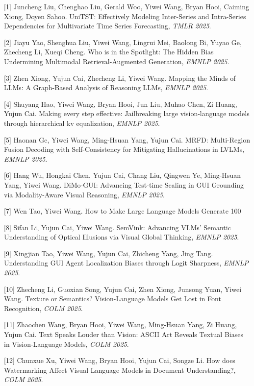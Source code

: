 [1] Juncheng Liu, Chenghao Liu, Gerald Woo, Yiwei Wang, Bryan Hooi, Caiming Xiong, Doyen Sahoo. UniTST: Effectively Modeling Inter-Series and Intra-Series Dependencies for Multivariate Time Series Forecasting, \textit{TMLR 2025}.

[2] Jiayu Yao, Shenghua Liu, Yiwei Wang, Lingrui Mei, Baolong Bi, Yuyao Ge, Zhecheng Li, Xueqi Cheng. Who is in the Spotlight: The Hidden Bias Undermining Multimodal Retrieval-Augmented Generation, \textit{EMNLP 2025}.

[3] Zhen Xiong, Yujun Cai, Zhecheng Li, Yiwei Wang. Mapping the Minds of LLMs: A Graph-Based Analysis of Reasoning LLMs, \textit{EMNLP 2025}.

[4] Shuyang Hao, Yiwei Wang, Bryan Hooi, Jun Liu, Muhao Chen, Zi Huang, Yujun Cai. Making every step effective: Jailbreaking large vision-language models through hierarchical kv equalization, \textit{EMNLP 2025}.

[5] Haonan Ge, Yiwei Wang, Ming-Hsuan Yang, Yujun Cai. MRFD: Multi-Region Fusion Decoding with Self-Consistency for Mitigating Hallucinations in LVLMs, \textit{EMNLP 2025}.

[6] Hang Wu, Hongkai Chen, Yujun Cai, Chang Liu, Qingwen Ye, Ming-Hsuan Yang, Yiwei Wang. DiMo-GUI: Advancing Test-time Scaling in GUI Grounding via Modality-Aware Visual Reasoning, \textit{EMNLP 2025}.

[7] Wen Tao, Yiwei Wang. How to Make Large Language Models Generate 100%

[8] Sifan Li, Yujun Cai, Yiwei Wang. SemVink: Advancing VLMs' Semantic Understanding of Optical Illusions via Visual Global Thinking, \textit{EMNLP 2025}.

[9] Xingjian Tao, Yiwei Wang, Yujun Cai, Zhicheng Yang, Jing Tang. Understanding GUI Agent Localization Biases through Logit Sharpness, \textit{EMNLP 2025}.

[10] Zhecheng Li, Guoxian Song, Yujun Cai, Zhen Xiong, Junsong Yuan, Yiwei Wang. Texture or Semantics? Vision-Language Models Get Lost in Font Recognition, \textit{COLM 2025}.

[11] Zhaochen Wang, Bryan Hooi, Yiwei Wang, Ming-Hsuan Yang, Zi Huang, Yujun Cai. Text Speaks Louder than Vision: ASCII Art Reveals Textual Biases in Vision-Language Models, \textit{COLM 2025}.

[12] Chunxue Xu, Yiwei Wang, Bryan Hooi, Yujun Cai, Songze Li. How does Watermarking Affect Visual Language Models in Document Understanding?, \textit{COLM 2025}.


